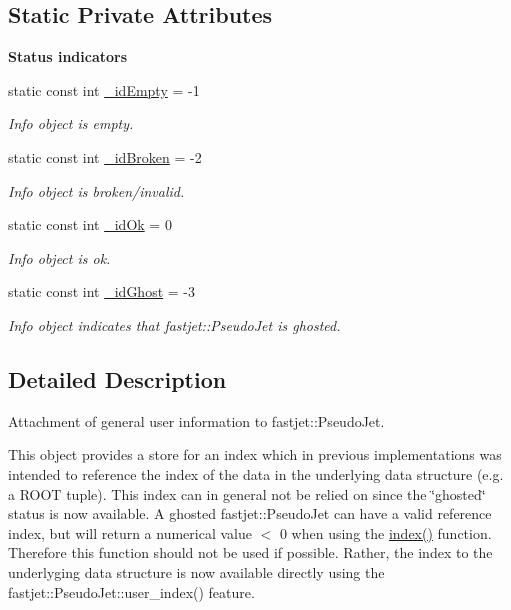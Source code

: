 \subsection*{Static Private Attributes}
\begin{Indent}{\bf Status indicators}\par
\begin{DoxyCompactItemize}
\item 
static const int \hyperlink{classAnalysis_1_1FastJet_1_1UserInfo_a48e0b4a7c3bd0c598334865c7772f3d7}{\+\_\+id\+Empty} = -\/1
\begin{DoxyCompactList}\small\item\em Info object is empty. \end{DoxyCompactList}\item 
static const int \hyperlink{classAnalysis_1_1FastJet_1_1UserInfo_aadf5fa5d0ecc73ef4eacf06657cda88c}{\+\_\+id\+Broken} = -\/2
\begin{DoxyCompactList}\small\item\em Info object is broken/invalid. \end{DoxyCompactList}\item 
static const int \hyperlink{classAnalysis_1_1FastJet_1_1UserInfo_a85f8fb3a938f3a5ccffcbab501c8acbc}{\+\_\+id\+Ok} = 0
\begin{DoxyCompactList}\small\item\em Info object is ok. \end{DoxyCompactList}\item 
static const int \hyperlink{classAnalysis_1_1FastJet_1_1UserInfo_ae7eefe2914d52bb4fa38566bdb300607}{\+\_\+id\+Ghost} = -\/3
\begin{DoxyCompactList}\small\item\em Info object indicates that {\ttfamily fastjet\+::\+Pseudo\+Jet} is ghosted. \end{DoxyCompactList}\end{DoxyCompactItemize}
\end{Indent}


\subsection{Detailed Description}
Attachment of general user information to {\ttfamily fastjet\+::\+Pseudo\+Jet}. 

This object provides a store for an index which in previous implementations was intended to reference the index of the data in the underlying data structure (e.\+g. a {\ttfamily R\+O\+OT} tuple). This index can in general not be relied on since the \char`\"{}ghosted\char`\"{} status is now available. A ghosted {\ttfamily fastjet\+::\+Pseudo\+Jet} can have a valid reference index, but will return a numerical value $<$ 0 when using the {\ttfamily \hyperlink{classAnalysis_1_1FastJet_1_1UserInfo_a687e6a814e58e5737108ef24aef047df}{index()}} function. Therefore this function should not be used if possible. Rather, the index to the underlyging data structure is now available directly using the {\ttfamily fastjet\+::\+Pseudo\+Jet\+::user\+\_\+index()} feature.

